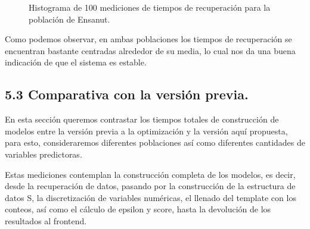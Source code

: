 \documentclass[
 12pt,
 letterpaper,
]{article}
\theoremstyle{teoremaBreak}
\theoremstyle{plain}
\theoremstyle{definition}
\begin{document}
\begin{figure}[H]
\caption{Histograma de 100 mediciones de tiempos de recuperación para la población de Ensanut.}
\label{fig:histograma-ensanut-estabilidad}
\end{figure}

Como podemos observar, en ambas poblaciones los tiempos de recuperación se encuentran bastante centradas alrededor de su media, 
lo cual nos da una buena indicación de que el sistema es estable.

\FloatBarrier



\subsection{5.3 Comparativa con la versión previa.}\label{5.3-comparativa-con-la-versión-previa.}


En esta sección queremos contrastar los tiempos totales de construcción de modelos entre la versión previa a la optimización y la 
versión aquí propuesta, para esto, consideraremos diferentes poblaciones así como diferentes cantidades de variables predictoras. 

Estas mediciones contemplan la construcción completa de los modelos, es decir, desde la recuperación de datos, pasando por la 
construcción de la estructura de datos S, la discretización de variables numéricas, el llenado del template con los conteos, así 
como el cálculo de epsilon y score, hasta la devolución de los resultados al frontend.
\end{document}
